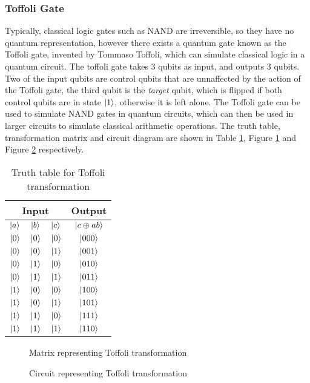 \subsubsection{Toffoli Gate}
Typically, classical logic gates such as NAND are irreversible, so they have no quantum representation, however there exists a quantum gate known as the Toffoli gate, invented by Tommaso Toffoli, which can simulate classical logic in a quantum circuit. The toffoli gate takes 3 qubits as input, and outputs 3 qubits. Two of the input qubits are control qubits that are unnaffected by the action of the Toffoli gate, the third qubit is the \emph{target} qubit, which is flipped if both control qubits are in state $\ket{1}$, otherwise it is left alone. The Toffoli gate can be used to simulate NAND gates in quantum circuits, which can then be used in larger circuits to simulate classical arithmetic operations. The truth table, transformation matrix and circuit diagram are shown in Table \ref{table:toffolitruth}, Figure \ref{fig:toffolimatrix} and Figure \ref{fig:toffolicircuit} respectively.
\begin{table}[!htb]
\centering
\begin{tabular}{|c|c|c||c|}
\hline 
\multicolumn{3}{|c||}{Input} & Output \\ 
\hline 
$\ket{a}$ & $\ket{b}$ & $\ket{c}$ & $\ket{c\oplus ab}$ \\ 
\hline 
$\ket{0}$ & $\ket{0}$ & $\ket{0}$ & $\ket{000}$ \\ 
\hline 
$\ket{0}$ & $\ket{0}$ & $\ket{1}$ & $\ket{001}$ \\ 
\hline 
$\ket{0}$ & $\ket{1}$ & $\ket{0}$ & $\ket{010}$ \\ 
\hline 
$\ket{0}$ & $\ket{1}$ & $\ket{1}$ & $\ket{011}$ \\ 
\hline 
$\ket{1}$ & $\ket{0}$ & $\ket{0}$ & $\ket{100}$ \\ 
\hline 
$\ket{1}$ & $\ket{0}$ & $\ket{1}$ & $\ket{101}$ \\ 
\hline 
$\ket{1}$ & $\ket{1}$ & $\ket{0}$ & $\ket{111}$ \\ 
\hline 
$\ket{1}$ & $\ket{1}$ & $\ket{1}$ & $\ket{110}$ \\ 
\hline 
\end{tabular} 
\caption{Truth table for Toffoli transformation}
\label{table:toffolitruth}
\end{table}
\begin{figure}[!htb]
\centering
\resizebox{5cm}{!}{}
\caption{Matrix representing Toffoli transformation}
\label{fig:toffolimatrix}
\end{figure}
\begin{figure}[!htb]
\centering
\resizebox{1.5cm}{!}{}
\caption{Circuit representing Toffoli transformation}
\label{fig:toffolicircuit}
\end{figure}
